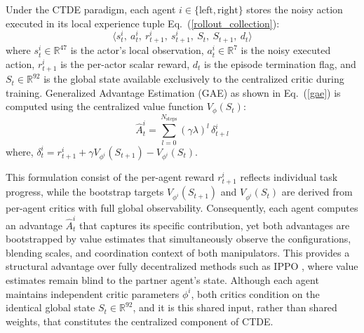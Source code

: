 \documentclass[a4paper,fleqn]{cas-dc}
\begin{document}
Under the CTDE paradigm, each agent $i \in \{\text{left}, \text{right}\}$ stores the noisy action executed in its local experience tuple Eq.~(\ref{rollout_collection}):
\begin{equation}
\langle s_t^i,\ a_t^i,\ r_{t+1}^i,\ s_{t+1}^i,\ S_t,\ S_{t+1},\ d_t \rangle
\label{rollout_collection}
\end{equation}
where $s_t^i \in \mathbb{R}^{47}$ is the actor's local observation, $a_t^i \in \mathbb{R}^7$ is the noisy executed action, $r_{t+1}^i$ is the per-actor scalar reward, $d_t$ is the episode termination flag, and $S_t \in \mathbb{R}^{92}$ is the global state available exclusively to the centralized critic during training.
\noindent Generalized Advantage Estimation (GAE) as shown in Eq.~(\ref{gae}) is computed using the centralized value function $V_\phi(S_t)$:
\begin{equation}
\hat{A}^{i}_t = \sum_{l=0}^{N_{\text{steps}}} (\gamma \lambda)^l \, \delta^{i}_{t+l}
\label{gae}
\end{equation}
where, $\delta_t^i = r_{t+1}^i + \gamma V_{\phi^{i}}(S_{t+1}) - V_{\phi^{i}}(S_t)$.

This formulation consist of the per-agent reward $r_{t+1}^i$ reflects individual task progress, while the bootstrap targets $V_{\phi^i}(S_{t+1})$ and $V_{\phi^i}(S_t)$ are derived from per-agent critics with full global observability. Consequently, each agent computes an advantage $\hat{A}_t^i$ that captures its specific contribution, yet both advantages are bootstrapped by value estimates that simultaneously observe the configurations, blending scales, and coordination context of both manipulators. This provides a structural advantage over fully decentralized methods such as IPPO \cite{IPPO}, where value estimates remain blind to the partner agent's state. Although each agent maintains independent critic parameters $\phi^i$, both critics condition on the identical global state $S_t \in \mathbb{R}^{92}$, and it is this shared input, rather than shared weights, that constitutes the centralized component of CTDE.
\end{document}
